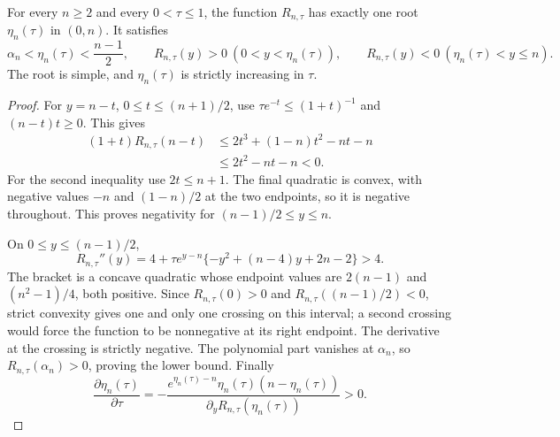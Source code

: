 \begin{lemma}\label{opt:lem:cutoff}
For every $n\geq2$ and every $0<\tau\leq1$, the function
$R_{n,\tau}$ has exactly one root $\eta_n(\tau)$ in $(0,n)$.
It satisfies
\[
 \alpha_n<\eta_n(\tau)<\frac{n-1}{2},
 \qquad
 R_{n,\tau}(y)>0\ (0<y<\eta_n(\tau)),\qquad
 R_{n,\tau}(y)<0\ (\eta_n(\tau)<y\leq n).
\]
The root is simple, and $\eta_n(\tau)$ is strictly increasing in $\tau$.
\end{lemma}
\begin{proof}
For $y=n-t$, $0\leq t\leq(n+1)/2$, use
$\tau e^{-t}\leq(1+t)^{-1}$ and $(n-t)t\geq0$. This gives
\begin{align*}
 (1+t)R_{n,\tau}(n-t)
 &\leq2t^3+(1-n)t^2-nt-n\\
 &\leq2t^2-nt-n<0.
\end{align*}
For the second inequality use $2t\leq n+1$. The final quadratic is
convex, with negative values $-n$ and $(1-n)/2$ at the two endpoints,
so it is negative throughout. This proves negativity for
$(n-1)/2\leq y\leq n$.

On $0\leq y\leq(n-1)/2$,
\[
 R_{n,\tau}''(y)
 =4+\tau e^{y-n}\{-y^2+(n-4)y+2n-2\}>4.
\]
The bracket is a concave quadratic whose endpoint values are
$2(n-1)$ and $(n^2-1)/4$, both positive. Since $R_{n,\tau}(0)>0$
and $R_{n,\tau}((n-1)/2)<0$, strict convexity gives one and only one
crossing on this interval; a second crossing would force the function
to be nonnegative at its right endpoint. The derivative at the crossing
is strictly negative. The polynomial part vanishes at $\alpha_n$, so
$R_{n,\tau}(\alpha_n)>0$, proving the lower bound. Finally
\[
 \frac{\partial\eta_n(\tau)}{\partial\tau}
 =-\frac{e^{\eta_n(\tau)-n}\eta_n(\tau)(n-\eta_n(\tau))}
 {\partial_yR_{n,\tau}(\eta_n(\tau))}>0.
\]
\end{proof}

